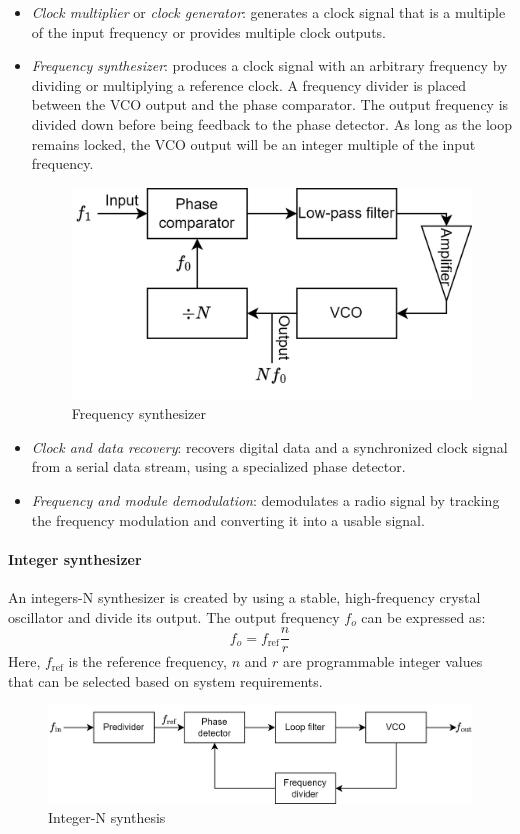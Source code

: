 \begin{itemize}
    \item \textit{Clock multiplier} or \textit{clock generator}: generates a clock signal that is a multiple of the input frequency or provides multiple clock outputs.
    \item \textit{Frequency synthesizer}: produces a clock signal with an arbitrary frequency by dividing or multiplying a reference clock.
        A frequency divider is placed between the VCO output and the phase comparator. 
        The output frequency is divided down before being feedback to the phase detector. 
        As long as the loop remains locked, the VCO output will be an integer multiple of the input frequency. 
        \begin{figure}[H]
            \centering
            \includegraphics[width=0.65\linewidth]{images/freq.png}
            \caption{Frequency synthesizer}
        \end{figure}
    \item \textit{Clock and data recovery}: recovers digital data and a synchronized clock signal from a serial data stream, using a specialized phase detector.
    \item \textit{Frequency and module demodulation}: demodulates a radio signal by tracking the frequency modulation and converting it into a usable signal.
\end{itemize}

\paragraph*{Integer synthesizer}
An integers-N synthesizer is created by using a stable, high-frequency crystal oscillator and divide its output.
The output frequency $f_{{o}}$ can be expressed as:
\[f_{{o}}=f_{\text{ref}}\dfrac{n}{r}\]
Here, $f_{\text{ref}}$ is the reference frequency, $n$ and $r$ are programmable integer values that can be selected based on system requirements.
\begin{figure}[H]
    \centering
    \includegraphics[width=0.75\linewidth]{images/freqn.png}
    \caption{Integer-N synthesis}
\end{figure}

